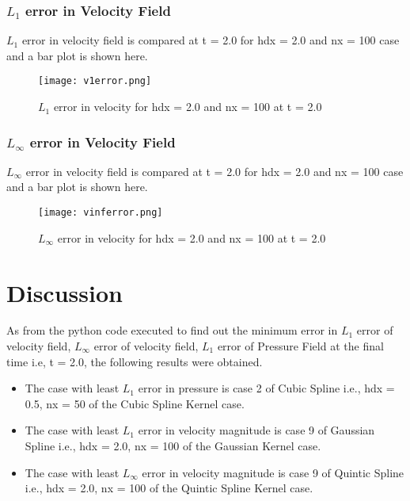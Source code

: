 \documentclass[11pt, a4paper]{article}
\begin{document}
\subsubsection{$L_1$ error in Velocity Field}
$L_1$ error in velocity field is compared at t = 2.0 for hdx = 2.0 and nx = 100 case and a bar plot is shown here.
\begin{figure}[H]
 \centering
 \texttt{[image: v1error.png]}
 \caption{$L_1$ error in velocity for hdx = 2.0 and nx = 100 at t = 2.0}
\end{figure}

\subsubsection{$L_\infty$ error in Velocity Field}
$L_\infty$ error in velocity field is compared at t = 2.0 for hdx = 2.0 and nx = 100 case and a bar plot is shown here.
\begin{figure}[H]
 \centering
 \texttt{[image: vinferror.png]}
 \caption{$L_\infty$ error in velocity for hdx = 2.0 and nx = 100 at t = 2.0}
\end{figure}

\section{Discussion}
As from the python code executed to find out the minimum error in $L_1$ error of velocity field, $L_\infty$ error of velocity field, $L_1$ error of Pressure Field at the final time i.e, t = 2.0, the following results were obtained.
\begin{itemize}
 \item The case with least $L_1$ error in  pressure is case 2 of Cubic Spline i.e., hdx = 0.5, nx = 50 of the Cubic Spline Kernel case.
 \item The case with least $L_1$ error in velocity magnitude is case 9 of Gaussian Spline i.e., hdx = 2.0, nx = 100 of the Gaussian Kernel case.
 \item The case with least $L_\infty$ error in velocity magnitude is case 9 of Quintic Spline i.e., hdx = 2.0, nx = 100 of the Quintic Spline Kernel case.
\end{itemize}
\end{document}
